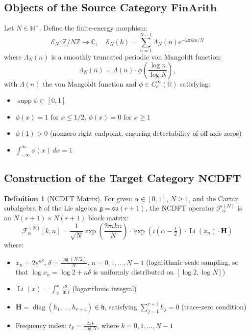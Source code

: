 \documentclass[12pt,a4paper]{amsart}
\theoremstyle{plain}
\theoremstyle{definition}
\newtheorem{definition}[theorem]{Definition}
\theoremstyle{remark}
\begin{document}
\subsection{Objects of the Source Category $\mathbf{FinArith}$}

Let $N\in\mathbb{N}^+$. Define the finite-energy morphism:
\[
\mathcal{E}_N: \mathbb{Z}/N\mathbb{Z} \to \mathbb{C}, \quad \mathcal{E}_N(k) = \sum_{n=1}^{N-1} \Lambda_N(n) e^{-2\pi i k n / N}
\]
where $\Lambda_N(n)$ is a smoothly truncated periodic von Mangoldt function:
\[
\Lambda_N(n) = \Lambda(n) \cdot \phi\left(\frac{\log n}{\log N}\right),
\]
with $\Lambda(n)$ the von Mangoldt function and $\phi \in C_c^\infty(\mathbb{R})$ satisfying:
\begin{itemize}
\item $\operatorname{supp} \phi \subset [0,1]$
\item $\phi(x)=1$ for $x \le 1/2$, $\phi(x)=0$ for $x \ge 1$
\item $\phi(1) > 0$ (nonzero right endpoint, ensuring detectability of off-axis zeros)
\item $\int_{-\infty}^\infty \phi(x)\,dx = 1$
\end{itemize}

\subsection{Construction of the Target Category $\mathbf{NCDFT}$}

\begin{definition}[NCDFT Matrix]
For given $\alpha \in [0,1]$, $N \geq 1$, and the Cartan subalgebra $\mathfrak{h}$ of the Lie algebra $\mathfrak{g} = \mathfrak{su}(r+1)$, the NCDFT operator $\mathcal{F}_\alpha^{(N)}$ is an $N(r+1) \times N(r+1)$ block matrix:
\[
\mathcal{F}_\alpha^{(N)}[k,n] = \frac{1}{\sqrt{N}} \exp\left(\frac{2\pi i k n}{N}\right) \cdot \exp\left(i(\alpha - \tfrac{1}{2}) \cdot \operatorname{Li}(x_n) \cdot \mathbf{H}\right)
\]
where:
\begin{itemize}
\item $x_n = 2e^{n\delta}$, $\delta = \frac{\log(N/2)}{N}$, $n=0,1,\dots,N-1$ (logarithmic-scale sampling, so that $\log x_n = \log 2 + n\delta$ is uniformly distributed on $[\log 2, \log N]$)
\item $\operatorname{Li}(x) = \int_2^x \frac{dt}{\ln t}$ (logarithmic integral)
\item $\mathbf{H} = \operatorname{diag}(h_1, \dots, h_{r+1}) \in \mathfrak{h}$, satisfying $\sum_{j=1}^{r+1} h_j = 0$ (trace-zero condition)
\item Frequency index: $t_k = \frac{2\pi k}{\log N}$, where $k = 0, 1, \dots, N-1$
\end{itemize}
\end{definition}
\end{document}
